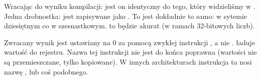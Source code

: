 Wracając do wyniku kompilacji: jest on identyczny do tego, który widzieliśmy w \IDA.
Jedna drobnostka:  jest zapisywane jako .
To jest dokładnie to samo:  w sytemie dziesiętnym co  w szesnastkowym.
 to będzie akurat  (w ramach 32-bitowych liczb).

Zwracany wynik jest ustawiany na 0 za pomocą zwykłej instrukcji \MOV, a nie \XOR.
\MOV ładuje wartość do rejestru.
Nazwa tej instrukcji nie jest do końca poprawna (wartości nie są przemieszczane, tylko kopiowane). W innych architekturach instrukcja ta nosi nazwę ,  lub coś podobnego.


